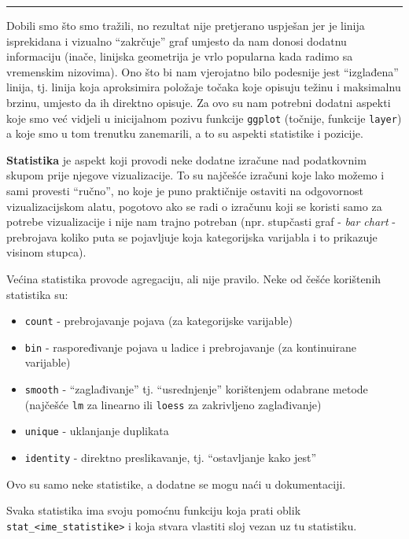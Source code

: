 \documentclass[]{book}
\providecommand{\tightlist}{%
  \setlength{\itemsep}{0pt}\setlength{\parskip}{0pt}}
\theoremstyle{definition}
\theoremstyle{definition}
\theoremstyle{definition}
\theoremstyle{remark}
\begin{document}
\begin{center}\rule{0.5\linewidth}{\linethickness}\end{center}

Dobili smo što smo tražili, no rezultat nije pretjerano uspješan jer je
linija isprekidana i vizualno ``zakrčuje'' graf umjesto da nam donosi
dodatnu informaciju (inače, linijska geometrija je vrlo popularna kada
radimo sa vremenskim nizovima). Ono što bi nam vjerojatno bilo podesnije
jest ``izglađena'' linija, tj. linija koja aproksimira položaje točaka
koje opisuju težinu i maksimalnu brzinu, umjesto da ih direktno opisuje.
Za ovo su nam potrebni dodatni aspekti koje smo već vidjeli u
inicijalnom pozivu funkcije \texttt{ggplot} (točnije, funkcije
\texttt{layer}) a koje smo u tom trenutku zanemarili, a to su aspekti
statistike i pozicije.

\textbf{Statistika} je aspekt koji provodi neke dodatne izračune nad
podatkovnim skupom prije njegove vizualizacije. To su najčešće izračuni
koje lako možemo i sami provesti ``ručno'', no koje je puno praktičnije
ostaviti na odgovornost vizualizacijskom alatu, pogotovo ako se radi o
izračunu koji se koristi samo za potrebe vizualizacije i nije nam trajno
potreban (npr. stupčasti graf - \emph{bar chart} - prebrojava koliko
puta se pojavljuje koja kategorijska varijabla i to prikazuje visinom
stupca).

Većina statistika provode agregaciju, ali nije pravilo. Neke od češće
korištenih statistika su:

\begin{itemize}
\tightlist
\item
  \texttt{count} - prebrojavanje pojava (za kategorijske varijable)
\item
  \texttt{bin} - raspoređivanje pojava u ladice i prebrojavanje (za
  kontinuirane varijable)
\item
  \texttt{smooth} - ``zaglađivanje'' tj. ``usrednjenje'' korištenjem
  odabrane metode (najčešće \texttt{lm} za linearno ili \texttt{loess}
  za zakrivljeno zaglađivanje)
\item
  \texttt{unique} - uklanjanje duplikata
\item
  \texttt{identity} - direktno preslikavanje, tj. ``ostavljanje kako
  jest''
\end{itemize}

Ovo su samo neke statistike, a dodatne se mogu naći u dokumentaciji.

Svaka statistika ima svoju pomoćnu funkciju koja prati oblik
\texttt{stat\_\textless{}ime\_statistike\textgreater{}} i koja stvara
vlastiti sloj vezan uz tu statistiku.
\end{document}
